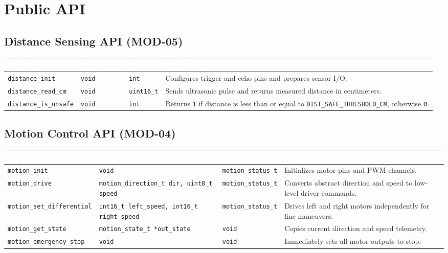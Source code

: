 \documentclass[a4paper,11pt]{article}
\newcommand{\theadtext}[1]{\textcolor{white}{\textbf{#1}}}
\begin{document}
\section{Public API}

\subsection{Distance Sensing API (MOD-05)}

\begin{tabular}{L{4.42cm} L{2.55cm} L{2.55cm} L{7.31cm}}
\toprule
{}
\theadtext{Function} & \theadtext{Parameters} & \theadtext{Return} & \theadtext{Description} \\
\midrule
{}   \texttt{distance\_init}      & \texttt{void} & \texttt{int}        & Configures trigger and echo pins and prepares sensor I/O. \\
 \texttt{distance\_read\_cm}  & \texttt{void} & \texttt{uint16\_t}  & Sends ultrasonic pulse and returns measured distance in centimeters. \\
   \texttt{distance\_is\_unsafe} & \texttt{void} & \texttt{int}        & Returns \texttt{1} if distance is less than or equal to \texttt{DIST\_SAFE\_THRESHOLD\_CM}, otherwise \texttt{0}. \\
\bottomrule
\end{tabular}

\subsection{Motion Control API (MOD-04)}

\begin{tabular}{L{4.42cm} L{4.08cm} L{2.72cm} L{5.61cm}}
\toprule
{}
\theadtext{Function} & \theadtext{Parameters} & \theadtext{Return} & \theadtext{Description} \\
\midrule
{}   \texttt{motion\_init}             & \texttt{void} & \texttt{motion\_status\_t} & Initializes motor pins and PWM channels. \\
 \texttt{motion\_drive}            & \texttt{motion\_direction\_t dir, uint8\_t speed} & \texttt{motion\_status\_t} & Converts abstract direction and speed to low-level driver commands. \\
   \texttt{motion\_set\_differential} & \texttt{int16\_t left\_speed, int16\_t right\_speed} & \texttt{motion\_status\_t} & Drives left and right motors independently for fine maneuvers. \\
 \texttt{motion\_get\_state}       & \texttt{motion\_state\_t *out\_state} & \texttt{void} & Copies current direction and speed telemetry. \\
   \texttt{motion\_emergency\_stop}  & \texttt{void} & \texttt{void} & Immediately sets all motor outputs to stop. \\
\bottomrule
\end{tabular}
\end{document}
